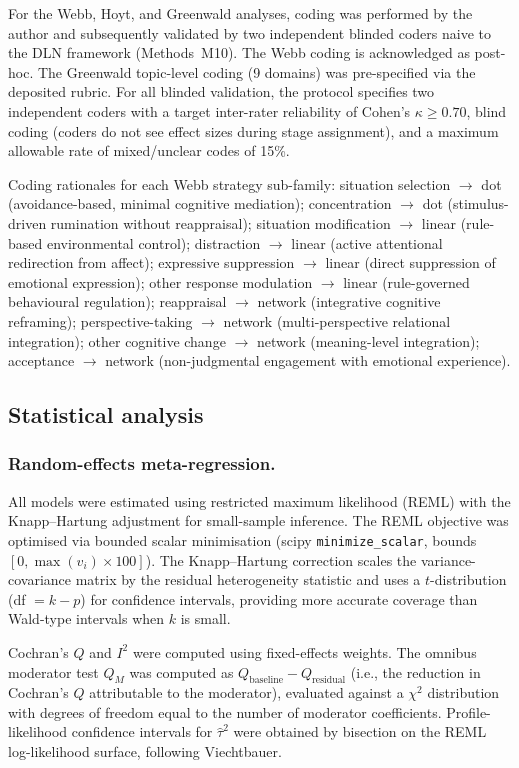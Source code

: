 \documentclass[11pt]{article}
\begin{document}
For the Webb, Hoyt, and Greenwald analyses, coding was performed by
the author and subsequently validated by two independent blinded coders
naive to the DLN framework (Methods~M10). The Webb coding is
acknowledged as post-hoc. The Greenwald topic-level coding (9 domains)
was pre-specified via the deposited rubric. For all blinded validation,
the protocol specifies two independent coders
with a target inter-rater reliability of Cohen's $\kappa \geq 0.70$,
blind coding (coders do not see effect sizes during stage assignment),
and a maximum allowable rate of mixed/unclear codes of 15\%.

Coding rationales for each Webb strategy sub-family: situation
selection $\to$ dot (avoidance-based, minimal cognitive mediation);
concentration $\to$ dot (stimulus-driven rumination without
reappraisal); situation modification $\to$ linear (rule-based
environmental control); distraction $\to$ linear (active attentional
redirection from affect); expressive suppression $\to$ linear (direct
suppression of emotional expression); other response modulation $\to$
linear (rule-governed behavioural regulation); reappraisal $\to$ network
(integrative cognitive reframing); perspective-taking $\to$ network
(multi-perspective relational integration); other cognitive change $\to$
network (meaning-level integration); acceptance $\to$ network
(non-judgmental engagement with emotional experience).


\subsection{Statistical analysis}

\subsubsection*{Random-effects meta-regression.}
All models were estimated using restricted maximum likelihood (REML)
with the Knapp--Hartung adjustment for small-sample inference. The REML
objective was optimised via bounded scalar minimisation (scipy
\texttt{minimize\_scalar}, bounds $[0, \max(v_i) \times 100]$). The
Knapp--Hartung correction scales the variance-covariance matrix by
the residual heterogeneity statistic and uses a $t$-distribution
(df $= k - p$) for confidence intervals, providing more accurate
coverage than Wald-type intervals when $k$ is
small\cite{IntHout2014}.

Cochran's $Q$ and $I^2$\cite{HigginsThompson2002} were computed using
fixed-effects weights. The omnibus moderator test $Q_M$ was computed as
$Q_{\text{baseline}} - Q_{\text{residual}}$ (i.e., the reduction in
Cochran's $Q$ attributable to the moderator), evaluated against a
$\chi^2$ distribution with degrees of freedom equal to the number of
moderator coefficients. Profile-likelihood confidence intervals for
$\hat\tau^2$ were obtained by bisection on the REML log-likelihood
surface, following Viechtbauer\cite{Viechtbauer2010}.
\end{document}
